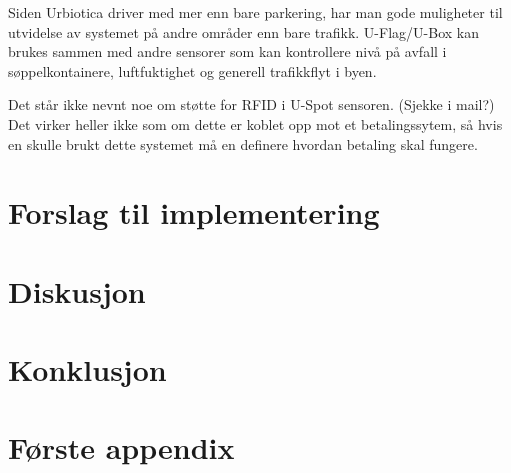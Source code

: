 \documentclass[a4paper, norsk, 12pt]{article}
\theoremstyle{remark}
\begin{document}
Siden Urbiotica driver med mer enn bare parkering, har man gode muligheter til utvidelse av systemet på andre områder enn bare trafikk. U-Flag/U-Box kan brukes sammen med andre sensorer som kan kontrollere nivå på avfall i søppelkontainere, luftfuktighet og generell trafikkflyt i byen. 

Det står ikke nevnt noe om støtte for RFID i U-Spot sensoren. (Sjekke i mail?) Det virker heller ikke som om dette er koblet opp mot et betalingssytem, så hvis en skulle brukt dette systemet må en definere hvordan betaling skal fungere. 


















\section{Forslag til implementering}
\label{sec:implementering}






\section{Diskusjon}
\label{sec:diskusjon}







\section{Konklusjon}
\label{sec:konklusjon}







\pagebreak
{}

\pagebreak




\appendix

\section{Første appendix}
\label{sec:}

\end{document}
